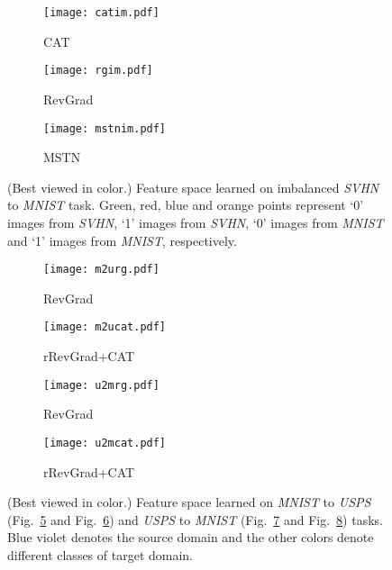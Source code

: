 \documentclass[10pt,twocolumn,letterpaper]{article}
\begin{document}
\begin{figure}[t]
\vspace{-0.4cm}
\centering
\begin{subfigure}{0.2\textwidth}
  \centering
  \texttt{[image: catim.pdf]}
  \caption{CAT}
  \label{afig:im-3}
\end{subfigure}
\begin{subfigure}{0.2\textwidth}
  \centering
  \texttt{[image: rgim.pdf]}
  \caption{RevGrad}
  \label{afig:im-1}
\end{subfigure}
\begin{subfigure}{0.2\textwidth}
  \centering
  \texttt{[image: mstnim.pdf]}
  \caption{MSTN}
  \label{afig:im-2}
\end{subfigure}
\vspace{-0.2cm}
\caption{(Best viewed in color.) Feature space learned on imbalanced \emph{SVHN} to \emph{MNIST} task. Green, red, blue and orange points represent `0' images from \emph{SVHN}, `1' images from \emph{SVHN}, `0' images from \emph{MNIST} and `1' images from \emph{MNIST}, respectively.}
\vspace{-0.4cm}
\label{afig:1}
\end{figure}

\begin{figure}[t]
\centering
\vspace{-0.3cm}
\begin{subfigure}{0.2\textwidth}
  \centering
  \texttt{[image: m2urg.pdf]}
  \caption{RevGrad}
  \label{afig:2-1}
\end{subfigure}
\begin{subfigure}{0.2\textwidth}
  \centering
  \texttt{[image: m2ucat.pdf]}
  \caption{rRevGrad+CAT}
  \label{afig:2-2}
\end{subfigure}
\begin{subfigure}{0.2\textwidth}
  \centering
  \texttt{[image: u2mrg.pdf]}
  \caption{RevGrad}
  \label{afig:3-1}
\end{subfigure}
\begin{subfigure}{0.2\textwidth}
  \centering
  \texttt{[image: u2mcat.pdf]}
  \caption{rRevGrad+CAT}
  \label{afig:3-2}
\end{subfigure}
\vspace{-0.2cm}
\caption{(Best viewed in color.) Feature space learned on \emph{MNIST} to \emph{USPS} (Fig.~\ref{afig:2-1} and Fig.~\ref{afig:2-2}) and \emph{USPS} to \emph{MNIST} (Fig.~\ref{afig:3-1} and Fig.~\ref{afig:3-2}) tasks. Blue violet denotes the source domain and the other colors denote different classes of target domain.}
\label{afig:2}
\end{figure}
\end{document}
